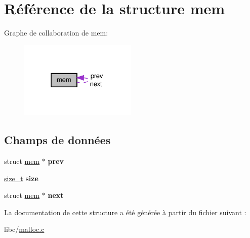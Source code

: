 \hypertarget{structmem}{\section{Référence de la structure mem}
\label{structmem}
}


Graphe de collaboration de mem\-:
\nopagebreak
\begin{figure}[H]
\begin{center}
\leavevmode
\includegraphics[width=158pt]{structmem__coll__graph}
\end{center}
\end{figure}
\subsection*{Champs de données}
\begin{DoxyCompactItemize}
\item 
\hypertarget{structmem_a2edfcacfe26d9112b0e4f745c9f75cf7}{struct \hyperlink{structmem}{mem} $\ast$ {\bfseries prev}}\label{structmem_a2edfcacfe26d9112b0e4f745c9f75cf7}

\item 
\hypertarget{structmem_a7d695ebc3fafa769e7e7a75f1d232a18}{\hyperlink{types_8h_a29d85914ddff32967d85ada69854206d}{size\-\_\-t} {\bfseries size}}\label{structmem_a7d695ebc3fafa769e7e7a75f1d232a18}

\item 
\hypertarget{structmem_ad12075ee870ccc6f67f420f09ff37732}{struct \hyperlink{structmem}{mem} $\ast$ {\bfseries next}}\label{structmem_ad12075ee870ccc6f67f420f09ff37732}

\end{DoxyCompactItemize}


La documentation de cette structure a été générée à partir du fichier suivant \-:\begin{DoxyCompactItemize}
\item 
libc/\hyperlink{malloc_8c}{malloc.\-c}\end{DoxyCompactItemize}
